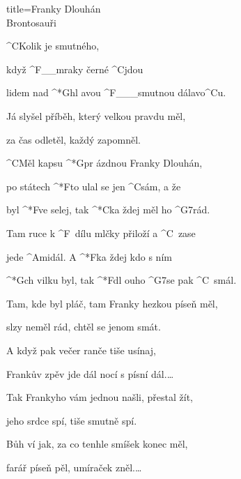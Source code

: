 \begin{song}{title=\predtitle\centering Franky Dlouhán \\\large Brontosauři  \vspace*{-0.3cm}}  %
\begin{centerjustified}
\nejvetsi

\sloka 
	^{C}Kolik je smutného,
	
	když ^{F{\color{white}\_\_}}mraky černé ^{C}jdou

	lidem nad ^*{G}hl avou ^{F{\color{white}\_\_\_}}smutnou dálavo^{C}u.
	
	Já slyšel příběh, který velkou pravdu měl,
	
	za čas odletěl, každý zapomněl.

	^{C}Měl kapsu ^*{G}pr ázdnou Franky Dlouhán,

	po státech ^*{F}to ulal se jen ^{C}sám, a že

	byl ^*{F}ve selej, tak ^*{C}ka ždej měl ho ^{G7}rád.

	Tam ruce k ^{F\,\,\,}dílu mlčky přiloží a ^{C\,\,\,}zase

	jede ^{Ami}dál. A ^*{F}ka ždej kdo s ním

	^*{G}ch vilku byl, tak ^*{F}dl ouho ^{G7}se pak ^{C\,\,\,}smál.
	
\sloka	
	Tam, kde byl pláč, tam Franky hezkou píseň měl,
	
	slzy neměl rád, chtěl se jenom smát.
	
	A když pak večer ranče tiše usínaj,
	
	Frankův zpěv jde dál nocí s písní dál.\elipsa\dots
	
\sloka
	Tak Frankyho vám jednou našli, přestal žít,
	
	jeho srdce spí, tiše smutně spí.
	
	Bůh ví jak, za co tenhle smíšek konec měl,
	
	farář píseň pěl, umíraček zněl.\elipsa\dots

\end{centerjustified}
\setcounter{Slokočet}{0}
\end{song}


